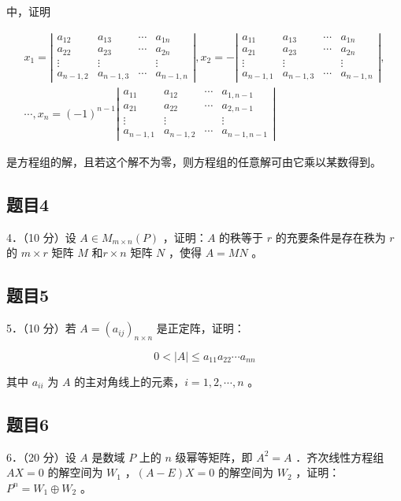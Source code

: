 \documentclass{article}
\begin{document}
中，证明

\[
\begin{gathered}
x_{1}=\left|\begin{array}{cccc}
a_{12} & a_{13} & \cdots & a_{1 n} \\
a_{22} & a_{23} & \cdots & a_{2 n} \\
\vdots & \vdots & & \vdots \\
a_{n-1,2} & a_{n-1,3} & \cdots & a_{n-1, n}
\end{array}\right|, x_{2}=-\left|\begin{array}{cccc}
a_{11} & a_{13} & \cdots & a_{1 n} \\
a_{21} & a_{23} & \cdots & a_{2 n} \\
\vdots & \vdots & & \vdots \\
a_{n-1,1} & a_{n-1,3} & \cdots & a_{n-1, n}
\end{array}\right|, \\
\cdots, x_{n}=(-1)^{n-1}\left|\begin{array}{cccc}
a_{11} & a_{12} & \cdots & a_{1, n-1} \\
a_{21} & a_{22} & \cdots & a_{2, n-1} \\
\vdots & \vdots & & \vdots \\
a_{n-1,1} & a_{n-1,2} & \cdots & a_{n-1, n-1}
\end{array}\right|
\end{gathered}
\]

是方程组的解，且若这个解不为零，则方程组的任意解可由它乘以某数得到。

\subsection{题目4}
4．（10 分）设 \(A \in M_{m \times n}(P)\) ，证明：\(A\) 的秩等于 \(r\) 的充要条件是存在秩为 \(r\) 的 \(m \times r\) 矩阵 \(M\) 和\(r \times n\) 矩阵 \(N\) ，使得 \(A=M N\) 。

\subsection{题目5}
5．（10 分）若 \(A=\left(a_{i j}\right)_{n \times n}\) 是正定阵，证明：

\[
0<|A| \leq a_{11} a_{22} \cdots a_{n n}
\]

其中 \(a_{i i}\) 为 \(A\) 的主对角线上的元素，\(i=1,2, \cdots, n\) 。

\subsection{题目6}
6．（20 分）设 \(A\) 是数域 \(P\) 上的 \(n\) 级幂等矩阵，即 \(A^{2}=A\) ．齐次线性方程组 \(A X=0\) 的解空间为 \(W_{1}\) ，\((A-E) X=0\) 的解空间为 \(W_{2}\) ，证明：\(P^{n}=W_{1} \oplus W_{2}\) 。
\end{document}
